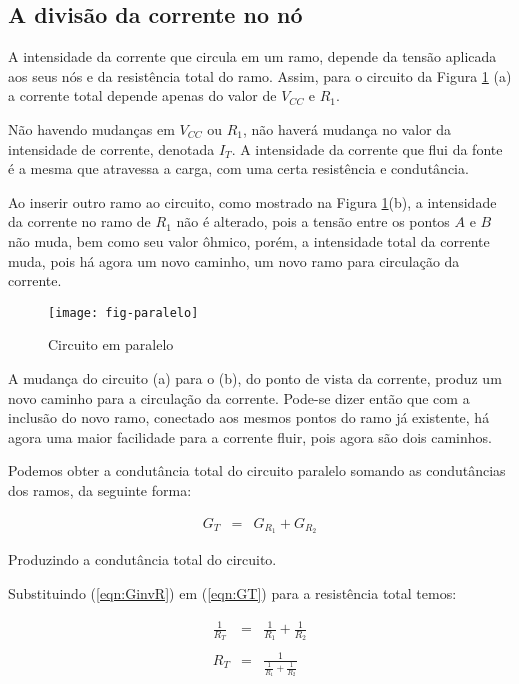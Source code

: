 \subsection{A divisão da corrente no nó}

A intensidade da corrente que circula em um ramo, depende da tensão aplicada aos seus nós e da resistência total do ramo. Assim, para o circuito da Figura \ref{fig:paralelo} (a) a corrente total depende apenas do valor de $V_{CC}$ e $R_1$.

Não havendo mudanças em $V_{CC}$ ou $R_1$, não haverá mudança no valor da intensidade de corrente, denotada $I_T$. A intensidade da corrente que flui da fonte é a mesma que atravessa a carga, com uma certa resistência e condutância.

Ao inserir outro ramo ao circuito, como mostrado na Figura \ref{fig:paralelo}(b), a intensidade da corrente no ramo de $R_1$ não é alterado, pois a tensão entre os pontos $A$ e $B$ não muda, bem como seu valor ôhmico, porém, a intensidade total da corrente muda, pois há agora um novo caminho, um novo ramo para circulação da corrente.

\begin{figure}[!h]
	\centering
	\caption{Circuito em paralelo}
	\texttt{[image: fig-paralelo]}
	\label{fig:paralelo}
\end{figure}

A mudança do circuito (a) para o (b), do ponto de vista da corrente, produz um novo caminho para a circulação da corrente. Pode-se dizer então que com a inclusão do novo ramo, conectado aos mesmos pontos do ramo já existente, há agora uma maior facilidade para a corrente fluir, pois agora são dois caminhos.

Podemos obter a condutância total do circuito paralelo somando as condutâncias dos ramos, da seguinte forma:

\begin{eqnarray}
  G_T & = & G_{R_1} + G_{R_2}
\label{eqn:GT}
\end{eqnarray}

Produzindo a condutância total do circuito.

Substituindo (\ref{eqn:GinvR}) em (\ref{eqn:GT}) para a resistência total temos:

\begin{eqnarray}
  \frac{1}{R_T}	& = & \frac{1}{R_1} + \frac{1}{R_2} \nonumber\\
	\nonumber\\
	R_T & = & \frac{1}{\frac{1}{R_1} + \frac{1}{R_2} }
\end{eqnarray}


